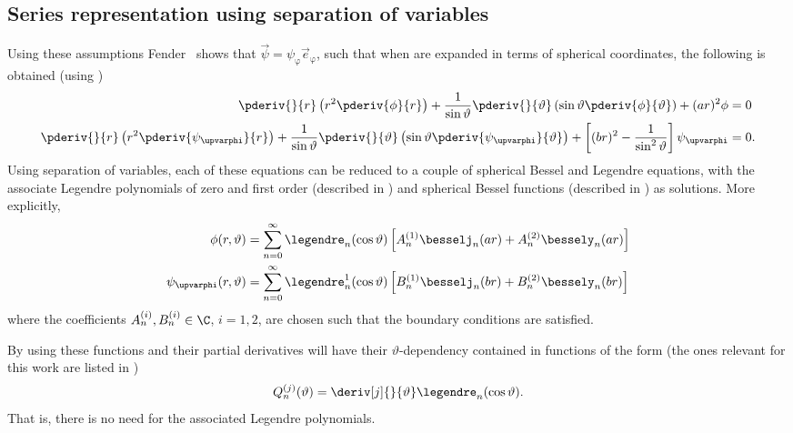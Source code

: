 \subsection{Series representation using separation of variables}
Using these assumptions Fender~\cite{Fender1972sfa} shows that $\vec{\psi}=\psi_\upvarphi\vec{e}_\upvarphi$, such that when  are expanded in terms of spherical coordinates, the following is obtained (using )
\begin{align}
	\pderiv{}{r}\left(r^2\pderiv{\phi}{r}\right) + \frac{1}{\sin\vartheta}\pderiv{}{\vartheta}\left(\sin\vartheta\pderiv{\phi}{\vartheta}\right) + (ar)^2\phi &= 0\\
	\pderiv{}{r}\left(r^2\pderiv{\psi_\upvarphi}{r}\right) + \frac{1}{\sin\vartheta}\pderiv{}{\vartheta}\left(\sin\vartheta\pderiv{\psi_\upvarphi}{\vartheta}\right) + \left[(br)^2-\frac{1}{\sin^2\vartheta}\right]\psi_\upvarphi &= 0.
\end{align}
Using separation of variables, each of these equations can be reduced to a couple of spherical Bessel and Legendre equations, with the associate Legendre polynomials of zero and first order (described in ) and spherical Bessel functions (described in ) as solutions. More explicitly,
\begin{align}
	\phi(r,\vartheta) &= \sum_{n=0}^\infty \legendre_n(\cos\vartheta)\left[A_n^{(1)}\besselj_n(ar)+A_n^{(2)}\bessely_n(ar)\right]\label{Eq1:phiSolution}\\
	\psi_\upvarphi(r,\vartheta) &= \sum_{n=0}^\infty \legendre_n^1(\cos\vartheta)\left[B_n^{(1)}\besselj_n(br)+B_n^{(2)}\bessely_n(br)\right]\label{Eq1:psiSolution}
\end{align}
where the coefficients $A_n^{(i)},B_n^{(i)}\in\C$, $i=1,2$, are chosen such that the boundary conditions are satisfied.

By using  these functions and their partial derivatives will have their $\vartheta$-dependency contained in functions of the form (the ones relevant for this work are listed in )
\begin{equation}
	Q_n^{(j)}(\vartheta) = \deriv[j]{}{\vartheta}\legendre_n(\cos\vartheta).
\end{equation}
That is, there is no need for the associated Legendre polynomials.

